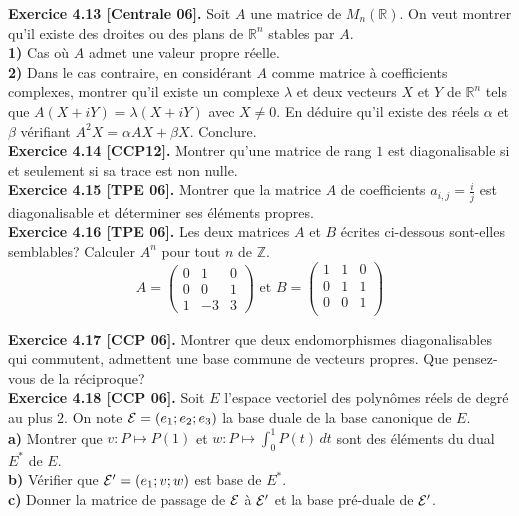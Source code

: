 \documentclass[a4paper,12pt,francais]{article}
\newcommand{\field}[1]{\mathbb{#1}}
\newcommand{\Z}{\field{Z}}
\newcommand{\R}{\field{R}}
\begin{document}
\noindent
{\bf Exercice 4.13 [Centrale 06].} Soit $A$ une matrice de
$M_n(\R)$. On veut montrer qu'il existe des droites ou des plans de
$\R^n$ stables par $A$.\\
{\bf 1)} Cas où $A$ admet une valeur propre réelle.\\
{\bf 2)} Dans le cas contraire, en considérant $A$ comme matrice à
coefficients complexes, montrer qu'il existe un complexe $\lambda$ et
deux vecteurs $X$ et $Y$ de $\R^n$ tels que
$A(X+iY)=\lambda(X+iY)$ avec $X\neq 0$. En déduire qu'il existe des
réels $\alpha$ et $\beta$ vérifiant $A^2X=\alpha A X+\beta X$. Conclure.\\  

\noindent
{\bf Exercice 4.14 [CCP12].} Montrer qu'une matrice de rang $1$ est
diagonalisable si et seulement si sa trace est non nulle.\\

\noindent
{\bf Exercice 4.15 [TPE 06].} Montrer que la matrice $A$ de
coefficients $a_{i,j}=\frac{i}{j}$ est diagonalisable et déterminer
ses éléments propres.\\

\noindent
{\bf Exercice 4.16 [TPE 06].} Les deux matrices $A$ et $B$ écrites
ci-dessous sont-elles semblables? Calculer $A^n$ pour tout $n$ de
$\Z$.
$$A=\left(
\begin{array}{ccc}
0&1&0\\
0&0&1\\
1&-3&3
\end{array}
\right)
\mbox{ et } 
B=\left(
\begin{array}{ccc}
1&1&0\\
0&1&1\\
0&0&1\\
\end{array}
\right)$$

\noindent
{\bf Exercice 4.17 [CCP 06].} Montrer que deux endomorphismes diagonalisables
qui commutent, admettent une base commune de vecteurs propres. Que
pensez-vous de la réciproque?\\

\noindent
{\bf Exercice 4.18 [CCP 06].} Soit $E$ l'espace vectoriel des polynômes
réels de degré au plus $2$. On note ${\cal{E}}=(e_1;e_2;e_3)$ la base duale de
la base canonique de $E$.\\
\indent
{\bf a)} Montrer que $v:P \mapsto P(1)$ et $w:P\mapsto \int_0^1 P(t)
\, dt $ sont des éléments du dual $E^*$ de $E$.\\
\indent
{\bf b)} Vérifier que ${\cal{E}}'=(e_1;v;w)$ est base de $E^*$.\\
\indent
{\bf c)} Donner la matrice de passage de $\cal{E}$ à ${\cal{E}}'$ et
la base pré-duale de ${\cal{E}}'$.\\
\end{document}

